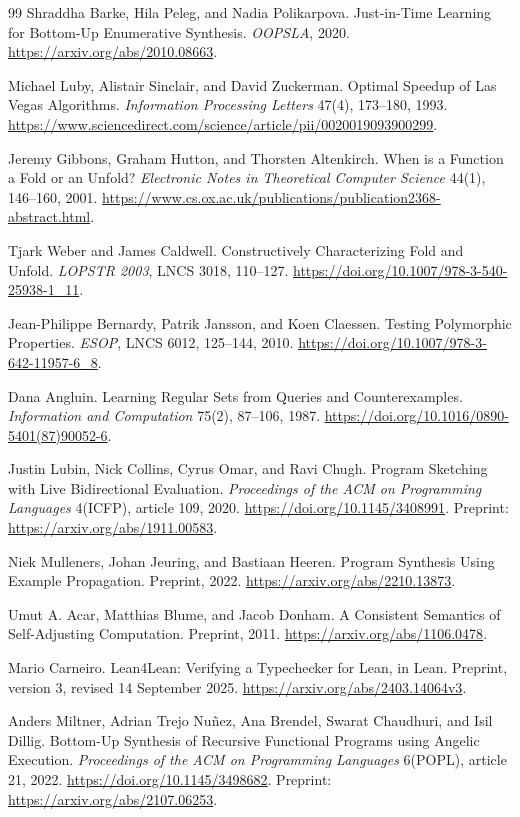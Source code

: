 \documentclass[11pt,a4paper]{article}
\theoremstyle{definition}
\theoremstyle{remark}
\begin{document}
\begin{thebibliography}{99}
Shraddha Barke, Hila Peleg, and Nadia Polikarpova. Just-in-Time Learning for
Bottom-Up Enumerative Synthesis. \emph{OOPSLA}, 2020.
\url{https://arxiv.org/abs/2010.08663}.

Michael Luby, Alistair Sinclair, and David Zuckerman. Optimal Speedup of Las Vegas
Algorithms. \emph{Information Processing Letters} 47(4), 173--180, 1993.
\url{https://www.sciencedirect.com/science/article/pii/0020019093900299}.

Jeremy Gibbons, Graham Hutton, and Thorsten Altenkirch. When is a Function a Fold
or an Unfold? \emph{Electronic Notes in Theoretical Computer Science} 44(1),
146--160, 2001.
\url{https://www.cs.ox.ac.uk/publications/publication2368-abstract.html}.

Tjark Weber and James Caldwell. Constructively Characterizing Fold and Unfold.
\emph{LOPSTR 2003}, LNCS 3018, 110--127.
\url{https://doi.org/10.1007/978-3-540-25938-1_11}.

Jean-Philippe Bernardy, Patrik Jansson, and Koen Claessen. Testing Polymorphic
Properties. \emph{ESOP}, LNCS 6012, 125--144, 2010.
\url{https://doi.org/10.1007/978-3-642-11957-6_8}.

Dana Angluin. Learning Regular Sets from Queries and Counterexamples.
\emph{Information and Computation} 75(2), 87--106, 1987.
\url{https://doi.org/10.1016/0890-5401(87)90052-6}.

Justin Lubin, Nick Collins, Cyrus Omar, and Ravi Chugh. Program Sketching with
Live Bidirectional Evaluation. \emph{Proceedings of the ACM on Programming
Languages} 4(ICFP), article 109, 2020.
\url{https://doi.org/10.1145/3408991}.
Preprint: \url{https://arxiv.org/abs/1911.00583}.

Niek Mulleners, Johan Jeuring, and Bastiaan Heeren. Program Synthesis Using
Example Propagation. Preprint, 2022.
\url{https://arxiv.org/abs/2210.13873}.

Umut A. Acar, Matthias Blume, and Jacob Donham. A Consistent Semantics of
Self-Adjusting Computation. Preprint, 2011.
\url{https://arxiv.org/abs/1106.0478}.

Mario Carneiro. Lean4Lean: Verifying a Typechecker for Lean, in Lean.
Preprint, version 3, revised 14 September 2025.
\url{https://arxiv.org/abs/2403.14064v3}.

Anders Miltner, Adrian Trejo Nu\~nez, Ana Brendel, Swarat Chaudhuri, and Isil Dillig.
Bottom-Up Synthesis of Recursive Functional Programs using Angelic Execution.
\emph{Proceedings of the ACM on Programming Languages} 6(POPL), article 21, 2022.
\url{https://doi.org/10.1145/3498682}.
Preprint: \url{https://arxiv.org/abs/2107.06253}.


\end{thebibliography}
\end{document}
